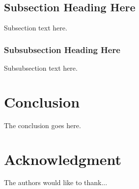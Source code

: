 \documentclass[conference]{IEEEtran}
\begin{document}
\subsection{Subsection Heading Here}
Subsection text here.


\subsubsection{Subsubsection Heading Here}
Subsubsection text here.


%
%
\section{Conclusion}
The conclusion goes here.

\section*{Acknowledgment}


The authors would like to thank...






\end{document}
